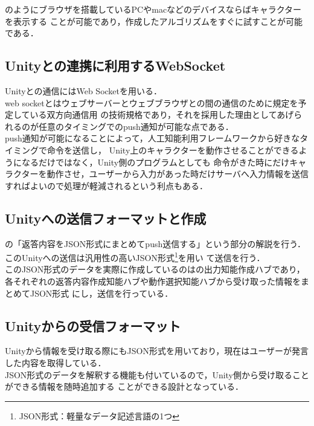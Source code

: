 のようにブラウザを搭載しているPCやmacなどのデバイスならばキャラクターを表示する
ことが可能であり，作成したアルゴリズムをすぐに試すことが可能である．
\\
\subsection{Unityとの連携に利用するWebSocket}
Unityとの通信にはWeb Socketを用いる．
\\
web socketとはウェブサーバーとウェブブラウザとの間の通信のために規定を予定している双方向通信用
の技術規格であり，それを採用した理由としてあげられるのが任意のタイミングでのpush通知が可能な点である．
\\
push通知が可能になることによって，人工知能利用フレームワークから好きなタイミングで命令を送信し，
Unity上のキャラクターを動作させることができるようになるだけではなく，Unity側のプログラムとしても
命令がきた時にだけキャラクターを動作させ，ユーザーから入力があった時だけサーバへ入力情報を送信
すればよいので処理が軽減されるという利点もある．\\

\subsection{Unityへの送信フォーマットと作成}
の「返答内容をJSON形式にまとめてpush送信する」という部分の解説を行う．\\
このUnityへの送信は汎用性の高いJSON形式\footnote{JSON形式：軽量なデータ記述言語の1つ}を用い
て送信を行う．\\

このJSON形式のデータを実際に作成しているのはの出力知能作成ハブであり，
各それぞれの返答内容作成知能ハブや動作選択知能ハブから受け取った情報をまとめてJSON形式
にし，送信を行っている．\\


\subsection{Unityからの受信フォーマット}
Unityから情報を受け取る際にもJSON形式を用いており，現在はユーザーが発言した内容を取得している．\\
JSON形式のデータを解釈する機能も付いているので，Unity側から受け取ることができる情報を随時追加する
ことができる設計となっている．\\


\newpage

